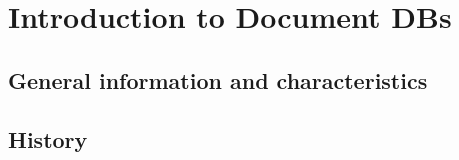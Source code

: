 
\section{Introduction to Document DBs}


\subsection{General information and characteristics}


\subsection{History}